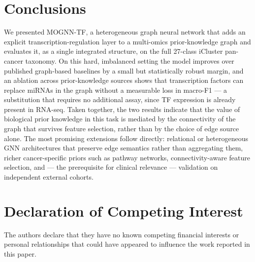 \documentclass[review,3p,times,11pt, ]{elsarticle} %
\begin{document}
\section{Conclusions}
\label{sec:conclusions}

We presented MOGNN-TF, a heterogeneous graph neural network that adds an
explicit transcription-regulation layer to a multi-omics prior-knowledge
graph and evaluates it, as a single integrated structure, on the full
27-class iCluster pan-cancer taxonomy. On this hard, imbalanced setting
the model improves over published graph-based baselines by a small but
statistically robust margin, and an ablation across prior-knowledge
sources shows that transcription factors can replace miRNAs in the graph
without a measurable loss in macro-F1 — a substitution that requires no
additional assay, since TF expression is already present in RNA-seq.
Taken together, the two results indicate that the value of biological
prior knowledge in this task is mediated by the connectivity of the
graph that survives feature selection, rather than by the choice of edge
source alone. The most promising extensions follow directly: relational
or heterogeneous GNN architectures that preserve edge semantics rather
than aggregating them, richer cancer-specific priors such as pathway
networks, connectivity-aware feature selection, and — the prerequisite
for clinical relevance — validation on independent external cohorts.

\section*{Declaration of Competing Interest}
The authors declare that they have no known competing financial interests or personal relationships that could have appeared to influence the work reported in this paper.

\end{document}
